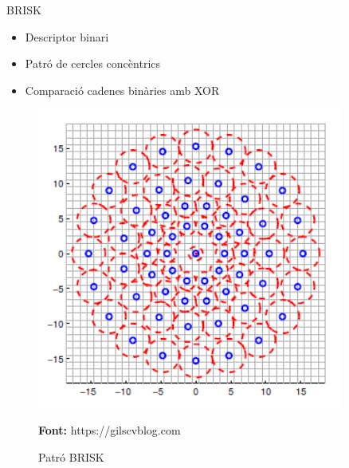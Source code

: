 \documentclass[xcolor=table, 11pt]{beamer}
\newcommand*{\captionsource}[2]{%
  \caption[{#1}]{#1}\par
  \vspace{-0.4cm}
  \tiny{\textbf{Font:} #2\par}}
\newcommand\tz{\fontsize{13}{15.6}\selectfont}
\begin{document}
	\begin{frame}{BRISK}
		\tz
		\begin{minipage}{0.53\textwidth}
			\begin{itemize}
				\item Descriptor binari
				\item Patró de cercles concèntrics
				\item Comparació cadenes binàries amb XOR
			\end{itemize}
		\end{minipage}
		\hfill
		\begin{minipage}{0.45\textwidth}
			\begin{figure}[H]
				\includegraphics[width=0.9\textwidth]{images/brisk}
				\captionsource{Patró BRISK\vspace{0.1cm}}{https://gilscvblog.com}
			\end{figure}
		\end{minipage}
	\end{frame}
\end{document}
